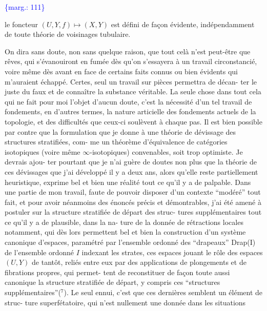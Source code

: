 \documentclass[11pt]{article}
\newcommand{\scanpage}[1]{\par\bigskip\noindent{\small\sffamily[scan #1]}\par}
\newcommand{\mspage}[1]{{\small\sffamily[p.\,#1]}}
\newcommand{\margin}[1]{\textcolor{blue}{\{\textsf{marg.:} #1\}}}
\begin{document}
\margin{111}

\clearpage
\scanpage{119/112}
\mspage{34}

le foncteur  $(U,Y,f) \longmapsto (X,Y)$   est défini de façon évidente,
indépendamment de toute théorie de voisinages tubulaire.

On dira sans doute, non sans quelque raison, que tout
celà n'est peut-être que rêves, qui s'évanouiront en fumée dès
qu'on s'essayera à un travail circonstancié, voire même dès avant
en face de certains faits connus ou bien évidents qui m'auraient
échappé. Certes, seul un travail sur pièces permettra de décan-%
ter le juste du faux et de connaître la substance véritable. La
seule chose dans tout cela qui ne fait pour moi l'objet d'aucun
doute, c'est la nécessité d'un tel travail de fondements, en
d'autres termes, la nature articielle des fondements actuels de
la topologie, et des difficultés que ceux-ci soulèvent à chaque
pas. Il est bien possible par contre que la formulation que je
donne à une théorie de dévissage des structures stratifiées, com-%
me un théorème d'équivalence de catégories isotopiques (voire même
$\infty$-isotopiques) convenables, soit trop optimiste. Je devrais ajou-%
ter pourtant que je n'ai guère de doutes non plus que la théorie
de ces dévissages que j'ai développé il y a deux ans, alors qu'elle
reste partiellement heuristique, exprime bel et bien une réalité
tout ce qu'il y a de palpable. Dans une partie de mon travail,
faute de pouvoir disposer d'un contexte ``modéré'' tout fait, et
pour avoir néanmoins des énoncés précis et démontrables, j'ai été
amené à postuler sur la structure stratifiée de départ des struc-%
tures supplémentaires tout ce qu'il y a de plausible, dans la na-%
ture de la donnée de rétractions locales notamment, qui dès lors
permettent bel et bien la construction d'un système canonique
d'espaces, paramétré par l'ensemble ordonné des ``drapeaux'' Drap(I)
de l'ensemble ordonné  $I$  indexant les strates, ces espaces jouant
le rôle des espaces  $(U,Y)$  de tantôt, reliés entre eux par des
applications de plongements et de fibrations propres, qui permet-%
tent de reconstituer de façon toute aussi canonique la structure
stratifiée de départ, y compris ces ``structures supplémentaires''(${}^{7}$).
Le seul ennui, c'est que ces dernières semblent un élément de struc-%
ture superfétatoire, qui n'est nullement une donnée dans les situations
\end{document}
